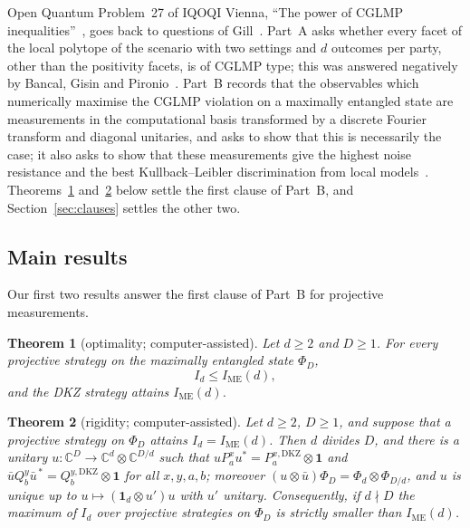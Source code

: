\documentclass[11pt]{amsart}
\newtheorem{introthm}{Theorem}
\theoremstyle{definition}
\theoremstyle{remark}
\numberwithin{equation}{section}
\newcommand{\C}{\mathbb{C}}
\newcommand{\IME}{I_{\mathrm{ME}}}
\newcommand{\one}{\mathbf{1}}
\begin{document}
Open Quantum Problem~27 of IQOQI Vienna, ``The power of CGLMP inequalities''~\cite{OQP}, goes back to questions of
Gill~\cite{Gill}. Part~A asks whether every facet of the local polytope of the scenario with two settings and $d$
outcomes per party, other than the positivity facets, is of CGLMP type; this was answered negatively by Bancal,
Gisin and Pironio~\cite{BGP}. Part~B records that the observables which numerically maximise the CGLMP violation on
a maximally entangled state are measurements in the computational basis transformed by a discrete Fourier transform
and diagonal unitaries, and asks to show that this is necessarily the case; it also asks to show that these
measurements give the highest noise resistance and the best Kullback--Leibler discrimination from local
models~\cite{vDGG}. Theorems~\ref{thm:A} and~\ref{thm:B} below settle the first clause of Part~B, and
Section~\ref{sec:clauses} settles the other two.

\subsection{Main results}
Our first two results answer the first clause of Part~B for projective measurements.

\begin{introthm}[optimality; computer-assisted]\label{thm:A}
Let $d\ge2$ and $D\ge1$. For every projective strategy on the maximally entangled state $\Phi_D$,
\[
I_d\le\IME(d),
\]
and the DKZ strategy attains $\IME(d)$.
\end{introthm}

\begin{introthm}[rigidity; computer-assisted]\label{thm:B}
Let $d\ge2$, $D\ge1$, and suppose that a projective strategy on $\Phi_D$ attains $I_d=\IME(d)$. Then $d$ divides $D$,
and there is a unitary $u\colon\C^D\to\C^d\otimes\C^{D/d}$ such that
$uP^x_au^*=P^{x,\mathrm{DKZ}}_a\otimes\one$ and $\bar uQ^y_b\bar u^{\,*}=Q^{y,\mathrm{DKZ}}_b\otimes\one$ for all
$x,y,a,b$; moreover $(u\otimes\bar u)\Phi_D=\Phi_d\otimes\Phi_{D/d}$, and $u$ is unique up to $u\mapsto(\one_d\otimes u')u$
with $u'$ unitary. Consequently, if $d\nmid D$ the maximum of $I_d$ over projective strategies on $\Phi_D$ is
strictly smaller than $\IME(d)$.
\end{introthm}
\end{document}
